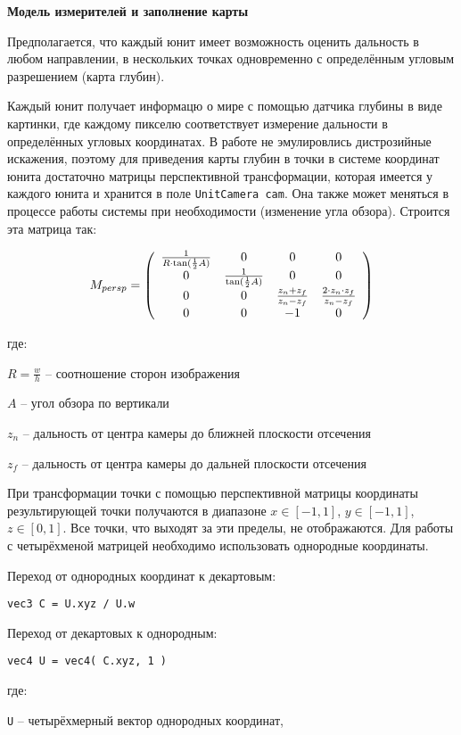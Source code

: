 \newpage
\textbf{Модель измерителей и заполнение карты}

Предполагается, что каждый юнит имеет возможность оценить дальность
в любом направлении, в нескольких точках одновременно с определённым
угловым разрешением (карта глубин).

Каждый юнит получает информацю о мире с помощью датчика глубины в виде картинки,
где каждому пикселю соответствует измерение дальности в определённых угловых
координатах. В работе не эмулировлись дистрозийные искажения, поэтому для
приведения карты глубин в точки в системе координат юнита достаточно матрицы
перспективной трансформации, которая имеется у каждого юнита и хранится в
поле \verb|UnitCamera cam|. Она также может меняться в процессе работы
системы при необходимости (изменение угла обзора). Строится эта матрица так:

$$
M_{persp} = \left( \begin{array}{c c c c}
        \frac{1}{ R \cdot \tan( \frac{1}{2} A ) } & 0 & 0 & 0 \\
        0 & \frac{1}{ \tan( \frac{1}{2} A ) } & 0 & 0 \\
        0 & 0 & \frac{ z_{n} + z_{f} }{ z_{n}-z_{f} } & \frac{ 2 \cdot z_{n} \cdot z_{f} }{ z_{n} - z_{f} } \\
        0 & 0 & -1 & 0
\end{array} \right)
$$

где:

$R = \frac{w}{h}$ -- соотношение сторон изображения

$A$ -- угол обзора по вертикали

$z_{n}$ -- дальность от центра камеры до ближней плоскости отсечения

$z_{f}$ -- дальность от центра камеры до дальней плоскости отсечения

При трансформации точки с помощью перспективной матрицы координаты результирующей
точки получаются в диапазоне $x \in [-1,1]$, $y \in [-1,1]$, $z \in [0,1]$.
Все точки, что выходят за эти пределы, не отображаются. Для работы с
четырёхменой матрицей необходимо использовать однородные координаты.

Переход от однородных координат к декартовым: 

\verb|vec3 C = U.xyz / U.w|

Переход от декартовых к однородным:

\verb|vec4 U = vec4( C.xyz, 1 )|

где:

\verb|U| -- четырёхмерный вектор однородных координат,

